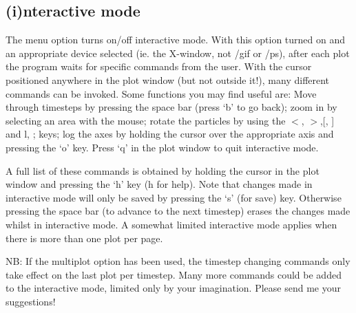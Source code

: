 \documentclass[a4paper,12pt]{article}
\begin{document}
\subsection{(i)nteractive mode}
 The menu option turns on/off interactive mode. With this option turned on and
an appropriate device selected (ie. the X-window, not /gif or /ps), after
each plot the program waits for specific commands from the user. With the cursor
positioned anywhere in the plot window (but not outside it!), many different
commands can be invoked. Some functions you may find useful are: Move through timesteps by pressing the space bar (press
 `b' to go back); zoom in by selecting an area with the mouse; rotate the
particles by using the $<$, $>$,[, ] and l, ; keys; log the axes by holding the cursor
over the appropriate axis and pressing the `o' key. Press `q' in the plot window
to quit interactive mode.

 A full list of these commands is obtained by holding
the cursor in the plot window and pressing the `h' key (h for help). Note that changes made in interactive mode will only be saved by pressing the
`s' (for save) key. Otherwise pressing the space bar (to advance to the next
timestep) erases the changes made whilst in interactive mode. A somewhat limited
interactive mode applies when there is more than one plot per page. 

 NB: If the multiplot option has been used, the timestep changing commands only
take effect on the last plot per timestep. Many more commands could be added to
the interactive mode, limited only by your imagination. Please send me your suggestions!
\end{document}
